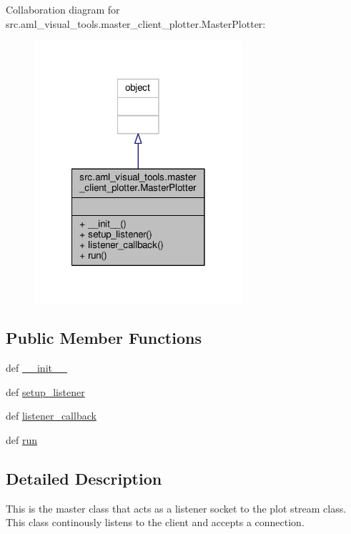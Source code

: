 Collaboration diagram for src.\-aml\-\_\-visual\-\_\-tools.\-master\-\_\-client\-\_\-plotter.\-Master\-Plotter\-:
\nopagebreak
\begin{figure}[H]
\begin{center}
\leavevmode
\includegraphics[width=218pt]{classsrc_1_1aml__visual__tools_1_1master__client__plotter_1_1_master_plotter__coll__graph}
\end{center}
\end{figure}
\subsection*{Public Member Functions}
\begin{DoxyCompactItemize}
\item 
def \hyperlink{classsrc_1_1aml__visual__tools_1_1master__client__plotter_1_1_master_plotter_ae576639042e298c74a8087bb9e6783e9}{\-\_\-\-\_\-init\-\_\-\-\_\-}
\item 
def \hyperlink{classsrc_1_1aml__visual__tools_1_1master__client__plotter_1_1_master_plotter_ac0e20b548ebe5b280b5294f79c189ba3}{setup\-\_\-listener}
\item 
def \hyperlink{classsrc_1_1aml__visual__tools_1_1master__client__plotter_1_1_master_plotter_a9c42d47e7912c065006aef42f687471d}{listener\-\_\-callback}
\item 
def \hyperlink{classsrc_1_1aml__visual__tools_1_1master__client__plotter_1_1_master_plotter_abd6a89a579282e21da25ae864e5aac45}{run}
\end{DoxyCompactItemize}


\subsection{Detailed Description}
\begin{DoxyVerb}This is the master class that acts as a listener socket to
the plot stream class. This class continously listens to the 
client and accepts a connection.
\end{DoxyVerb}
 

